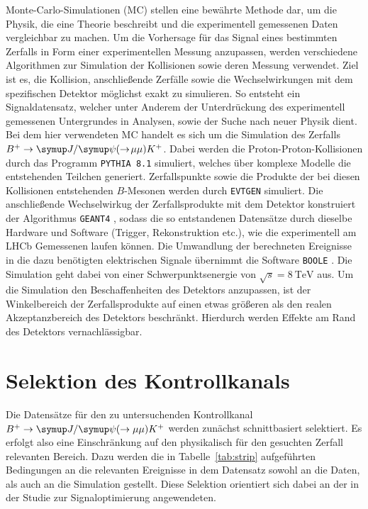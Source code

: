 Monte-Carlo-Simulationen (MC) stellen eine bewährte Methode dar, um die Physik, die eine Theorie beschreibt und die experimentell gemessenen Daten vergleichbar zu machen. Um die Vorhersage für das Signal eines bestimmten Zerfalls in Form einer experimentellen Messung anzupassen, werden verschiedene Algorithmen zur Simulation der Kollisionen sowie deren Messung verwendet. Ziel ist es, die Kollision, anschließende Zerfälle sowie die Wechselwirkungen mit dem spezifischen Detektor möglichst exakt zu simulieren. So entsteht ein Signaldatensatz, welcher unter Anderem der Unterdrückung des experimentell gemessenen Untergrundes in Analysen, sowie der Suche nach neuer Physik dient. Bei dem hier verwendeten MC handelt es sich um die Simulation des Zerfalls $B^{+}\rightarrow\jpsi(\rightarrow\!\mu\mu) K^{+}$. Dabei werden die Proton-Proton-Kollisionen durch das Programm \texttt{PYTHIA 8.1} \cite{pythia} simuliert, welches über komplexe Modelle die entstehenden Teilchen generiert. Zerfallspunkte sowie die Produkte der bei diesen Kollisionen entstehenden $B$-Mesonen werden durch \texttt{EVTGEN} \cite{evtgen} simuliert. Die anschließende Wechselwirkug der Zerfallsprodukte mit dem Detektor konstruiert der Algorithmus \texttt{GEANT4}  \cite{geant4}, sodass die so entstandenen Datensätze durch dieselbe Hardware und Software (Trigger, Rekonstruktion etc.), wie die experimentell am LHCb Gemessenen laufen können. Die Umwandlung der berechneten Ereignisse in die dazu benötigten elektrischen Signale übernimmt die Software \texttt{BOOLE} \cite{boole}. Die Simulation geht dabei von einer Schwerpunktsenergie von $\sqrt{s}=\SI{8}{\tera\electronvolt}$ aus. Um die Simulation den Beschaffenheiten des Detektors anzupassen, ist der Winkelbereich der Zerfallsprodukte auf einen etwas größeren als den realen Akzeptanzbereich des Detektors beschränkt. Hierdurch werden Effekte am Rand des Detektors vernachlässigbar.
\section{Selektion des Kontrollkanals}
Die Datensätze für den zu untersuchenden Kontrollkanal $B^{+}\rightarrow\jpsi(\rightarrow\mu\mu) K^{+}$ werden zunächst schnittbasiert selektiert. Es erfolgt also eine Einschränkung auf den physikalisch für den gesuchten Zerfall relevanten Bereich. Dazu werden die in Tabelle~\ref{tab:strip} aufgeführten Bedingungen an die relevanten Ereignisse in dem Datensatz sowohl an die Daten, als auch an die Simulation gestellt. Diese Selektion orientiert sich dabei an der in der Studie zur Signaloptimierung \cite{ba-maik} angewendeten.

